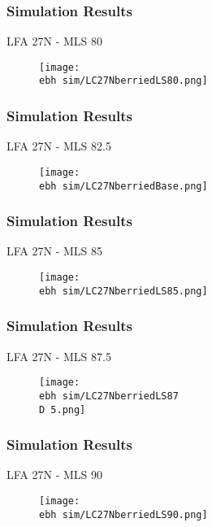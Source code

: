 \documentclass{beamer}
\newcommand{\ebh}{\string~/bio.data/bio.lobster/figures/LFA2733Framework2018/} %
\newcommand{\D}{.}
\begin{document}
\begin{frame}
\frametitle{Simulation Results}
LFA 27N - MLS 80
\begin{figure}
        \begin{center}
            \texttt{[image: \\ebh sim/LC27NberriedLS80.png]}
        \end{center}
    \end{figure}
\end{frame}


\begin{frame}
\frametitle{Simulation Results}
LFA 27N - MLS 82.5
\begin{figure}
        \begin{center}
            \texttt{[image: \\ebh sim/LC27NberriedBase.png]}
        \end{center}
    \end{figure}
\end{frame}



\begin{frame}
\frametitle{Simulation Results}
LFA 27N - MLS 85
\begin{figure}
        \begin{center}
            \texttt{[image: \\ebh sim/LC27NberriedLS85.png]}
        \end{center}
    \end{figure}
\end{frame}


\begin{frame}
\frametitle{Simulation Results}
LFA 27N - MLS 87.5
\begin{figure}
        \begin{center}
            \texttt{[image: \\ebh sim/LC27NberriedLS87\\D 5.png]}
        \end{center}
    \end{figure}
\end{frame}


\begin{frame}
\frametitle{Simulation Results}
LFA 27N - MLS 90
\begin{figure}
        \begin{center}
            \texttt{[image: \\ebh sim/LC27NberriedLS90.png]}
        \end{center}
    \end{figure}
\end{frame}
\end{document}
